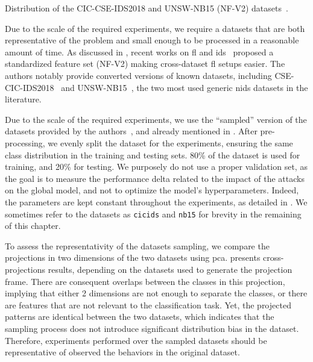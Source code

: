 \begin{table}
  \centering
  \caption{
    Distribution of the CIC-CSE-IDS2018 and UNSW-NB15 (NF-V2) datasets~\cite{sarhan_StandardFeatureSet_2022,layeghy_GeneralisabilityMachineLearningbased_2022}.
    \label{tbl:assess.datasets}
  }
  
\end{table}



Due to the scale of the required experiments, we require a datasets that are both representative of the problem and small enough to be processed in a reasonable amount of time.
As discussed in , recent works on \gls{fl} and \gls{ids}~\cite{sarhan_StandardFeatureSet_2021} proposed a standardized feature set (NF-V2) making cross-dataset \gls{fl} setups easier.
The authors notably provide converted versions of known datasets, including CSE-CIC-IDS2018~\cite{sharafaldin_GeneratingNewIntrusion_2018} and UNSW-NB15~\cite{moustafa_UNSWNB15comprehensivedata_2015}, the two most used generic \gls{nids} datasets in the literature.

Due to the scale of the required experiments, we use the ``sampled'' version of the datasets provided by the authors~\cite{layeghy_GeneralisabilityMachineLearningbased_2022}, and already mentioned in .
After pre-processing, we evenly split the dataset for the experiments, ensuring the same class distribution in the training and testing sets.
80\% of the dataset is used for training, and 20\% for testing.
We purposely do not use a proper validation set, as the goal is to measure the performance delta related to the impact of the attacks on the global model, and not to optimize the model's hyperparameters.
Indeed, the parameters are kept constant throughout the experiments, as detailed in .
We sometimes refer to the datasets as \texttt{cicids} and \texttt{nb15} for brevity in the remaining of this chapter.

To assess the representativity of the datasets sampling, we compare the projections in two dimensions of the two datasets using \gls{pca}.
 presents cross-projections results, depending on the datasets used to generate the projection frame.
There are consequent overlaps between the classes in this projection, implying that either 2 dimensions are not enough to separate the classes, or there are features that are not relevant to the classification task.
Yet, the projected patterns are identical between the two datasets, which indicates that the sampling process does not introduce significant distribution bias in the dataset.
Therefore, experiments performed over the sampled datasets should be representative of observed the behaviors in the original dataset.



